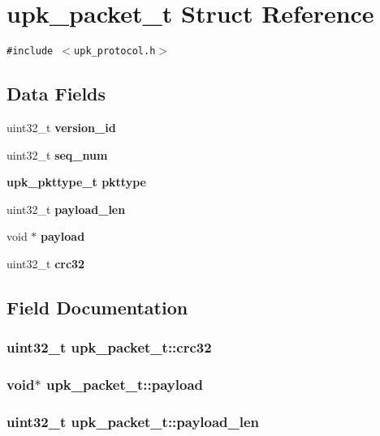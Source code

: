 \section{upk\_\-packet\_\-t Struct Reference}
\label{structupk__packet__t}
{\tt \#include $<$upk\_\-protocol.h$>$}

\subsection*{Data Fields}
\begin{CompactItemize}
\item 
uint32\_\-t \bf{version\_\-id}
\item 
uint32\_\-t \bf{seq\_\-num}
\item 
\bf{upk\_\-pkttype\_\-t} \bf{pkttype}
\item 
uint32\_\-t \bf{payload\_\-len}
\item 
void $\ast$ \bf{payload}
\item 
uint32\_\-t \bf{crc32}
\end{CompactItemize}


\subsection{Field Documentation}
\subsubsection{\setlength{\rightskip}{0pt plus 5cm}uint32\_\-t \bf{upk\_\-packet\_\-t::crc32}}\label{structupk__packet__t_b97203b5fc065402a6c38ac2cf63465a}


\subsubsection{\setlength{\rightskip}{0pt plus 5cm}void$\ast$ \bf{upk\_\-packet\_\-t::payload}}\label{structupk__packet__t_6caffbd5be082e8e5af970b5e1ace87e}


\subsubsection{\setlength{\rightskip}{0pt plus 5cm}uint32\_\-t \bf{upk\_\-packet\_\-t::payload\_\-len}}\label{structupk__packet__t_3ed4e0cff00c31c0580426edb59bcd6d}


